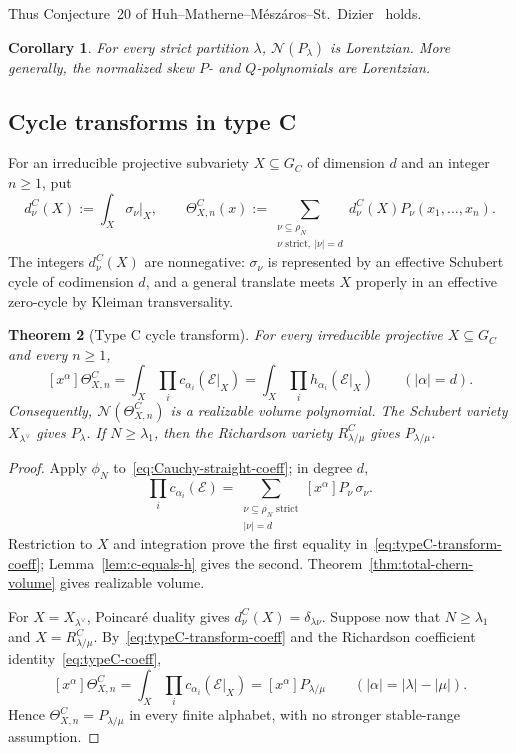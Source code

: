 \documentclass[11pt,a4paper,oneside]{amsart}
\numberwithin{equation}{section}
\newtheorem{theorem}{Theorem}[section]
\newtheorem{corollary}[theorem]{Corollary}
\theoremstyle{definition}
\theoremstyle{remark}
\newcommand{\cN}{\mathcal N}
\newcommand{\cE}{\mathcal E}
\begin{document}
Thus Conjecture~20 of Huh--Matherne--M\'esz\'aros--St.~Dizier~\cite[Conjecture~20]{HMMSD22} holds.

\begin{corollary}\label{cor:P-conjecture}
For every strict partition $\lambda$, $\cN(P_\lambda)$ is Lorentzian.  More generally, the normalized skew $P$- and $Q$-polynomials are Lorentzian.
\end{corollary}

\subsection{Cycle transforms in type C}

For an irreducible projective subvariety $X\subseteq G_C$ of dimension $d$ and an integer $n\geq1$, put
\begin{equation}\label{eq:typeC-transform}
 d_\nu^C(X):=\int_X\sigma_\nu|_X,
 \qquad
 \Theta^C_{X,n}(x):=
 \sum_{\substack{\nu\subseteq\rho_N\\\nu\text{ strict},\ |\nu|=d}}
 d_\nu^C(X)P_\nu(x_1,\ldots,x_n).
\end{equation}
The integers $d_\nu^C(X)$ are nonnegative: $\sigma_\nu$ is represented by an effective Schubert cycle of codimension $d$, and a general translate meets $X$ properly in an effective zero-cycle by Kleiman transversality.

\begin{theorem}[Type C cycle transform]\label{thm:typeC-transform}
For every irreducible projective $X\subseteq G_C$ and every $n\geq1$,
\begin{equation}\label{eq:typeC-transform-coeff}
 [x^\alpha]\Theta^C_{X,n}
 =\int_X\prod_i c_{\alpha_i}(\cE|_X)
 =\int_X\prod_i h_{\alpha_i}(\cE|_X)
 \qquad(|\alpha|=d).
\end{equation}
Consequently, $\cN(\Theta^C_{X,n})$ is a realizable volume polynomial.  The Schubert variety $X_{\lambda^\vee}$ gives $P_\lambda$.  If $N\geq\lambda_1$, then the Richardson variety $R^C_{\lambda/\mu}$ gives $P_{\lambda/\mu}$.
\end{theorem}

\begin{proof}
Apply $\phi_N$ to~\eqref{eq:Cauchy-straight-coeff}; in degree $d$,
\[
 \prod_i c_{\alpha_i}(\cE)
 =\sum_{\substack{\nu\subseteq\rho_N\text{ strict}\\|\nu|=d}}
 [x^\alpha]P_\nu\,\sigma_\nu.
\]
Restriction to $X$ and integration prove the first equality in~\eqref{eq:typeC-transform-coeff}; Lemma~\ref{lem:c-equals-h} gives the second.  Theorem~\ref{thm:total-chern-volume} gives realizable volume.

For $X=X_{\lambda^\vee}$, Poincar\'e duality gives $d_\nu^C(X)=\delta_{\lambda\nu}$.  Suppose now that $N\geq\lambda_1$ and $X=R^C_{\lambda/\mu}$.  By~\eqref{eq:typeC-transform-coeff} and the Richardson coefficient identity~\eqref{eq:typeC-coeff},
\[
 [x^\alpha]\Theta^C_{X,n}
 =\int_X\prod_i c_{\alpha_i}(\cE|_X)
 =[x^\alpha]P_{\lambda/\mu}
 \qquad(|\alpha|=|\lambda|-|\mu|).
\]
Hence $\Theta^C_{X,n}=P_{\lambda/\mu}$ in every finite alphabet, with no stronger stable-range assumption.
\end{proof}
\end{document}

